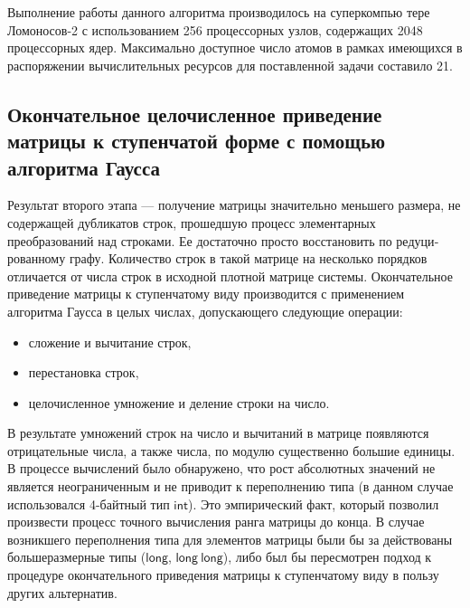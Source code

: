 Выполнение работы данного алгоритма производилось на суперкомпью­ тере Ломоносов-2 с использованием 256 процессорных узлов, содержащих 2048 процессорных ядер. Максимально доступное число атомов в рамках имеющихся в распоряжении вычислительных ресурсов для поставленной задачи состави­ло 21.

\subsection{Окончательное целочисленное приведение матрицы к ступенчатой форме с помощью алгоритма Гаусса}\label{subsec:ch4/subsect3}
Результат второго этапа --- получение матрицы значительно меньшего размера, не содержащей дубликатов строк, прошедшую процесс элементарных преобразований над строками. Ее достаточно просто восстановить по редуци­рованному графу. Количество строк в такой матрице на несколько порядков отличается от числа строк в исходной плотной матрице системы. Окончатель­ное приведение матрицы к ступенчатому виду производится с применением алгоритма Гаусса в целых числах, допускающего следующие операции:
\begin{itemize}
\item{сложение и вычитание строк,}
\item{перестановка строк,}
\item{целочисленное умножение и деление строки на число.}
\end{itemize}

В результате умножений строк на число и вычитаний в матрице появля­ются отрицательные числа, а также числа, по модулю существенно большие единицы. В процессе вычислений было обнаружено, что рост абсолютных зна­чений не является неограниченным и не приводит к переполнению типа (в данном случае использовался 4-байтный тип $\mathsf{int}$). Это эмпирический факт, кото­рый позволил произвести процесс точного вычисления ранга матрицы до конца. В случае возникшего переполнения типа для элементов матрицы были бы за­ действованы большеразмерные типы ($\mathsf{long}$, $\mathsf{long~long}$), либо был бы пересмотрен подход к процедуре окончательного приведения матрицы к ступенчатому виду в пользу других альтернатив.

